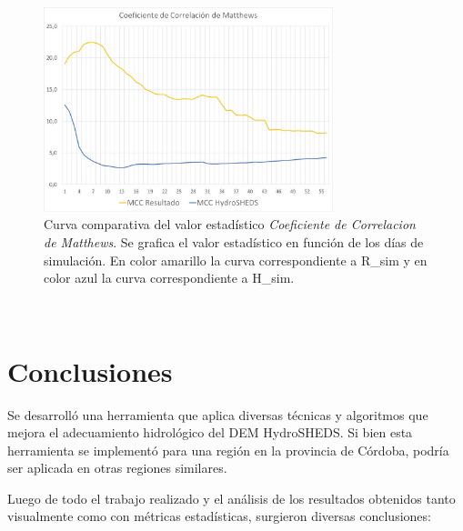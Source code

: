 \documentclass[10pt,a4paper, twoside]{report}
\begin{document}
\begin{figure}[H]
   \centering      
   \includegraphics[width=0.75\textwidth]{imagenes/MCC.jpg}
 \caption{Curva comparativa del valor estadístico \textit{Coeficiente de Correlacion de Matthews}. Se grafica el valor estadístico en función de los días de simulación. En color amarillo la curva correspondiente a R\_sim y en color azul la curva correspondiente a H\_sim.}
 \label{MCC}
\end{figure}


\newpage
$\ $
\thispagestyle{empty}

\chapter{Conclusiones}
\label{chap:conclusiones}

Se desarrolló una herramienta que aplica diversas técnicas y algoritmos que mejora el adecuamiento hidrológico del DEM HydroSHEDS. Si bien esta herramienta se implementó para una región en la provincia de Córdoba, podría ser aplicada en otras regiones similares.

Luego de todo el trabajo realizado y el análisis de los resultados obtenidos tanto visualmente como con métricas estadísticas, surgieron diversas conclusiones:
\end{document}
